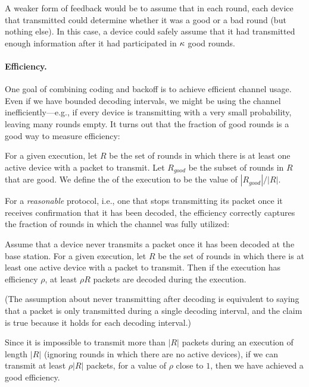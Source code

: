 A weaker form of feedback would be to assume that in each round, each device that transmitted could determine whether it was a good or a bad round (but nothing else).  In this case, a device could safely assume that it had transmitted enough information after it had participated in $\kappa$ good rounds.


\paragraph{Efficiency.}  One goal of combining coding and backoff is to achieve efficient channel usage.  Even if we have bounded decoding intervals, we might be using the channel inefficiently---e.g., if every device is transmitting with a very small probability, leaving many rounds empty.  It turns out that the fraction of good rounds is a good way to measure efficiency:
\begin{definition}
For a given execution, let $R$ be the set of rounds in which there is at least one active device with a packet to transmit.  Let $R_{good}$ be the subset of rounds in $R$ that are good.  We define the  of the execution to be the value of $|R_{good}|/|R|$.
\end{definition}  
For a \emph{reasonable} protocol, i.e., one that stops transmitting its packet once it receives confirmation that it has been decoded, the efficiency correctly captures the fraction of rounds in which the channel was fully utilized:
\begin{claim}
Assume that a device never transmits a packet once it has been decoded at the base station.  For a given execution, let $R$ be the set of rounds in which there is at least one active device with a packet to transmit.  Then if the execution has efficiency $\rho$, at least $\rho R$ packets are decoded during the execution.
\end{claim}
(The assumption about never transmitting after decoding is equivalent to saying that a packet is only transmitted during a single decoding interval, and the claim is true because it holds for each decoding interval.)

Since it is impossible to transmit more than $|R|$ packets during an execution of length $|R|$ (ignoring rounds in which there are no active devices), if we can transmit at least $\rho |R|$ packets, for a value of $\rho$ close to $1$, then we have achieved a good efficiency.

